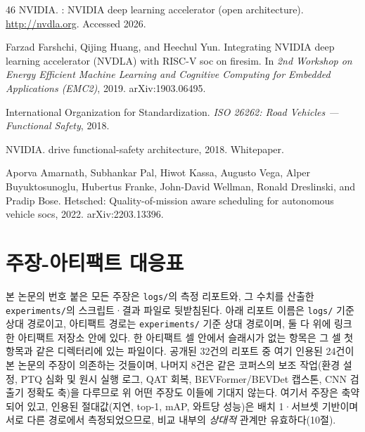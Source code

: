 \documentclass[11pt]{article}
\begin{document}
\begin{thebibliography}{46}
{NVIDIA}.
: {NVIDIA} deep learning accelerator (open architecture).
\newblock \url{http://nvdla.org}.
\newblock Accessed 2026.

Farzad Farshchi, Qijing Huang, and Heechul Yun.
\newblock Integrating {NVIDIA} deep learning accelerator ({NVDLA}) with {RISC-V} soc on firesim.
\newblock In \emph{2nd Workshop on Energy Efficient Machine Learning and Cognitive Computing for Embedded Applications (EMC2)}, 2019.
\newblock arXiv:1903.06495.

{International Organization for Standardization}.
\newblock \emph{ISO 26262: Road Vehicles --- Functional Safety}, 2018.

{NVIDIA}.
 drive functional-safety architecture, 2018.
\newblock Whitepaper.

Aporva Amarnath, Subhankar Pal, Hiwot Kassa, Augusto Vega, Alper Buyuktosunoglu, Hubertus Franke, John-David Wellman, Ronald Dreslinski, and Pradip Bose.
\newblock Hetsched: Quality-of-mission aware scheduling for autonomous vehicle socs, 2022.
\newblock arXiv:2203.13396.

\end{thebibliography}

\appendix

\section{주장-아티팩트 대응표}
\label{app:map}

본 논문의 번호 붙은 모든 주장은 \texttt{logs/}의 측정 리포트와, 그 수치를 산출한 \texttt{experiments/}의 스크립트·결과 파일로 뒷받침된다. 아래 리포트 이름은 \texttt{logs/} 기준 상대 경로이고, 아티팩트 경로는 \texttt{experiments/} 기준 상대 경로이며, 둘 다 위에 링크한 아티팩트 저장소 안에 있다. 한 아티팩트 셀 안에서 슬래시가 없는 항목은 그 셀 첫 항목과 같은 디렉터리에 있는 파일이다. 공개된 32건의 리포트 중 여기 인용된 24건이 본 논문의 주장이 의존하는 것들이며, 나머지 8건은 같은 코퍼스의 보조 작업(환경 설정, PTQ 심화 및 원시 실행 로그, QAT 회복, BEVFormer/BEVDet 캡스톤, CNN 검출기 정확도 축)을 다루므로 위 어떤 주장도 이들에 기대지 않는다. 여기서 주장은 축약되어 있고, 인용된 절대값(지연, top-1, mAP, 와트당 성능)은 배치 1·서브셋 기반이며 서로 다른 경로에서 측정되었으므로, 비교 내부의 \emph{상대적} 관계만 유효하다(10절).
\end{document}
